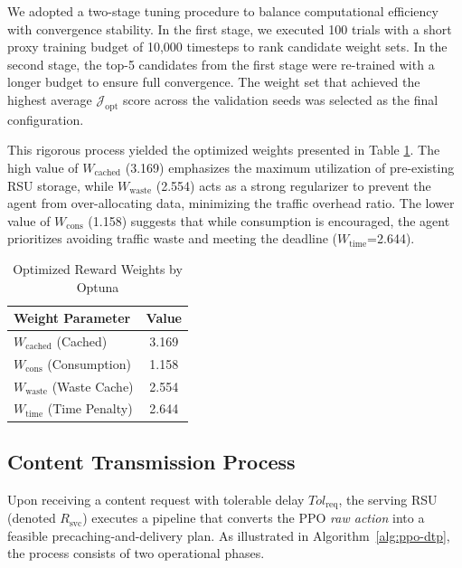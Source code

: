 We adopted a two-stage tuning procedure to balance computational efficiency with convergence stability. In the first stage, we executed 100 trials with a short proxy training budget of 10,000 timesteps to rank candidate weight sets. In the second stage, the top-5 candidates from the first stage were re-trained with a longer budget to ensure full convergence. The weight set that achieved the highest average $\mathcal{J}_{\text{opt}}$ score across the validation seeds was selected as the final configuration.

This rigorous process yielded the optimized weights presented in Table \ref{tab:weights}. The high value of $W_{\text{cached}}$ (3.169) emphasizes the maximum utilization of pre-existing RSU storage, while $W_{\text{waste}}$ (2.554) acts as a strong regularizer to prevent the agent from over-allocating data, minimizing the traffic overhead ratio. The lower value of $W_{\text{cons}}$ (1.158) suggests that while consumption is encouraged, the agent prioritizes avoiding traffic waste and meeting the deadline ($W_{\text{time}}$=2.644).

\begin{table}[h]
\centering
\caption{Optimized Reward Weights by Optuna}
\label{tab:weights}
\begin{tabular}{|l|c|}
\hline
\textbf{Weight Parameter} & \textbf{Value} \\ \hline
$W_{\text{cached}}$ (Cached) & 3.169 \\
$W_{\text{cons}}$ (Consumption) & 1.158 \\
$W_{\text{waste}}$ (Waste Cache) & 2.554 \\
$W_{\text{time}}$ (Time Penalty) & 2.644 \\ \hline
\end{tabular}
\end{table}

\subsection{Content Transmission Process}
Upon receiving a content request with tolerable delay $Tol_{\text{req}}$, the serving RSU (denoted $R_{\text{svc}}$) executes a pipeline that converts the PPO \emph{raw action} into a feasible precaching-and-delivery plan. As illustrated in Algorithm~\ref{alg:ppo-dtp}, the process consists of two operational phases.

